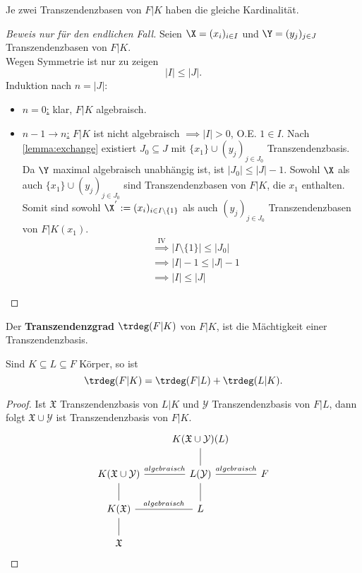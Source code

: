 \begin{satz}[Steinitz, 1910]
    Je zwei Transzendenzbasen von $F|K$ haben die gleiche Kardinalität.
\end{satz}

\begin{proof}[Beweis nur für den endlichen Fall]
    Seien $\X=(x_i)_{i \in I}$ und $\Y = (y_j)_{j \in J}$ Transzendenzbasen von $F|K$.\\
    Wegen Symmetrie ist nur zu zeigen
    $$ |I| \leq |J|. $$
    Induktion nach $n = |J|$:
    \begin{itemize}[label=]
        \item \underline{$n=0$:} klar, $F|K$ algebraisch.
        \item  \underline{$n-1 \to n$:} $F|K$ ist nicht algebraisch 
        $\implies |I| > 0$, O.E. $1 \in I$. Nach \cref{lemma:exchange} existiert $J_0 \subseteq J$ mit
        $\{x_1\} \cup (y_j)_{j\in J_0}$ Transzendenzbasis. 
        Da $\Y$ maximal algebraisch unabhängig ist, ist $|J_0| \leq |J| -1$.
        Sowohl $\X$ als auch $\{x_1\} \cup (y_j)_{j \in J_0}$ sind Transzendenzbasen von $F|K$, die $x_1$ enthalten.
        Somit sind sowohl $\X^{'}:= (x_i)_{i \in I\setminus \{1\}}$ als auch $(y_j)_{j \in J_0}$ Transzendenzbasen von $F|K(x_1)$.
        \begin{align*}
            &\stackrel{\text{IV}}{\implies} |I \setminus\{1\}| \leq |J_0| \\
            &\implies |I| -1 \leq |J| -1 \\
            &\implies |I| \leq |J|            
        \end{align*}
    \end{itemize}
\end{proof}

\begin{definition}
    Der \textbf{Transzendenzgrad} $\trdeg(F|K)$ von $F|K$, ist die Mächtigkeit einer Transzendenzbasis.
\end{definition}

\begin{korollar}
    Sind $K \subseteq L \subseteq F$ Körper, so ist 
    $$ \trdeg(F|K) = \trdeg(F|L) + \trdeg(L|K). $$
\end{korollar}
\begin{proof}
    Ist $\mathfrak{X}$ Transzendenzbasis von $L|K$ und $\mathcal{Y}$ Transzendenzbasis von $F|L$, dann folgt
    $ \mathfrak{X} \cup \mathcal{Y}$ ist Transzendenzbasis von $F|K$.
    $$\begin{tikzcd}
        & K(\mathfrak{X} \cup \mathcal{Y})(L) & \\
        K(\mathfrak{X} \cup \mathcal{Y}) \rar[dash]{algebraisch} & L(\mathcal{Y}) \uar[dash] \rar[dash]{algebraisch} & F \\
        K(\mathfrak{X}) \uar[dash] \rar[dash]{algebraisch}& L \uar[dash] & \\
        \mathfrak{X} \uar[dash] & &
    \end{tikzcd}$$
\end{proof}

